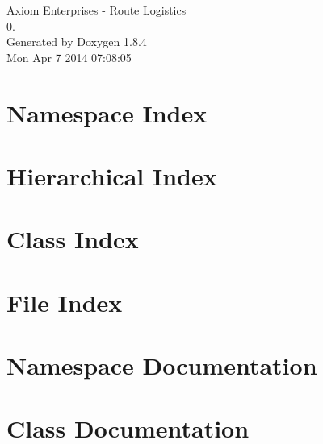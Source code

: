 \documentclass[twoside]{book}
\newcommand{\clearemptydoublepage}{%
  \newpage{\pagestyle{empty}\cleardoublepage}%
}
\begin{document}
\hypersetup{pageanchor=false}
\begin{titlepage}
\vspace*{7cm}
\begin{center}%
{\Large Axiom Enterprises -\/ Route Logistics \\[1ex]\large 0. }\\
\vspace*{1cm}
{\large Generated by Doxygen 1.8.4}\\
\vspace*{0.5cm}
{\small Mon Apr 7 2014 07:08:05}\\
\end{center}
\end{titlepage}
\clearemptydoublepage
\tableofcontents
\clearemptydoublepage
{}
\hypersetup{pageanchor=true}

\chapter{Namespace Index}

\chapter{Hierarchical Index}

\chapter{Class Index}

\chapter{File Index}

\chapter{Namespace Documentation}




\chapter{Class Documentation}












\end{document}
